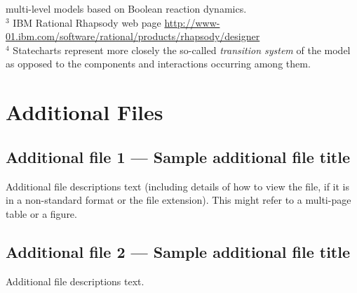 \documentclass{bmcart}
\begin{document}
\begin{backmatter}
\begin{table}[!hbt]
{multi-level models based on Boolean reaction dynamics.\\
$^3$ {IBM Rational Rhapsody} web page \protect\url{http://www-01.ibm.com/software/rational/products/rhapsody/designer}\\
$^4$ Statecharts represent more closely the so-called \protect\emph{transition system} of the model as opposed to the components and interactions occurring among them.
\label{tab:tool-comparison}}
\end{table}



\clearpage

\section*{Additional Files}
  \subsection*{Additional file 1 --- Sample additional file title}
    Additional file descriptions text (including details of how to
    view the file, if it is in a non-standard format or the file extension).  This might
    refer to a multi-page table or a figure.

  \subsection*{Additional file 2 --- Sample additional file title}
    Additional file descriptions text.


\end{backmatter}



\appendix
\clearpage
\setcounter{figure}{0}
\setcounter{table}{0}
\setcounter{page}{1}
\onecolumn



% 
\end{document}
